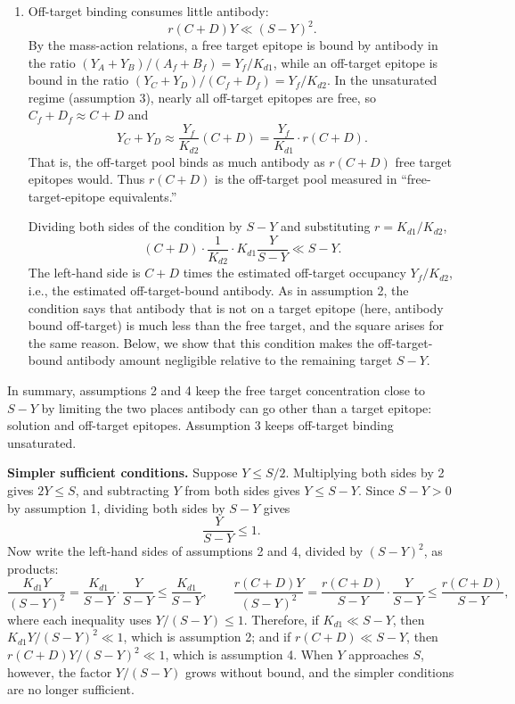\documentclass[11pt]{article}
\begin{document}
\begin{enumerate}
    The quantity $rY$ is not especially meaningful on its own; the
    rearrangement $Y\ll(S-Y)/r$ is more interpretable. Rearranging the
    mass-action relation, the target-bound antibody is
    $Y_A+Y_B=Y_f(A_f+B_f)/K_{d1}$. For $Y_f$ to reach $K_{d2}$ while about
    $S-Y$ target remains free, the target-bound antibody would have to be
    about $K_{d2}(S-Y)/K_{d1}=(S-Y)/r$. The condition says that the total
    antibody is far below this amount. Below, we show that this condition
    implies $Y_f\ll K_{d2}$.

    \item Off-target binding consumes little antibody:
    $$
    r(C+D)Y\ll(S-Y)^2.
    $$
    By the mass-action relations, a free target epitope is bound by
    antibody in the ratio $(Y_A+Y_B)/(A_f+B_f)=Y_f/K_{d1}$, while an
    off-target epitope is bound in the ratio
    $(Y_C+Y_D)/(C_f+D_f)=Y_f/K_{d2}$. In the unsaturated regime
    (assumption 3), nearly all off-target epitopes are free, so
    $C_f+D_f\approx C+D$ and
    $$
    Y_C+Y_D
    \approx\frac{Y_f}{K_{d2}}(C+D)
    =\frac{Y_f}{K_{d1}}\cdot r(C+D).
    $$
    That is, the off-target pool binds as much antibody as $r(C+D)$ free
    target epitopes would. Thus $r(C+D)$ is the off-target pool measured in
    ``free-target-epitope equivalents.''

    Dividing both sides of the condition by $S-Y$ and substituting
    $r=K_{d1}/K_{d2}$,
    $$
    (C+D)\cdot\frac{1}{K_{d2}}\cdot K_{d1}\frac{Y}{S-Y}\ll S-Y.
    $$
    The left-hand side is $C+D$ times the estimated off-target occupancy
    $Y_f/K_{d2}$, i.e., the estimated off-target-bound antibody. As in
    assumption 2, the condition says that antibody that is not on a target
    epitope (here, antibody bound off-target) is much less than the free
    target, and the square arises for the same reason. Below, we show that
    this condition makes the off-target-bound antibody amount negligible
    relative to the remaining target $S-Y$.
\end{enumerate}
In summary, assumptions 2 and 4 keep the free target concentration close
to $S-Y$ by limiting the two places antibody can go other than a target
epitope: solution and off-target epitopes. Assumption 3 keeps off-target
binding unsaturated.

\textbf{Simpler sufficient conditions.} Suppose $Y\le S/2$. Multiplying
both sides by 2 gives $2Y\le S$, and subtracting $Y$ from both sides gives
$Y\le S-Y$. Since $S-Y>0$ by assumption 1, dividing both sides by $S-Y$
gives
$$
\frac{Y}{S-Y}\le1.
$$
Now write the left-hand sides of assumptions 2 and 4, divided by
$(S-Y)^2$, as products:
$$
\frac{K_{d1}Y}{(S-Y)^2}
=\frac{K_{d1}}{S-Y}\cdot\frac{Y}{S-Y}
\le\frac{K_{d1}}{S-Y},
\qquad
\frac{r(C+D)Y}{(S-Y)^2}
=\frac{r(C+D)}{S-Y}\cdot\frac{Y}{S-Y}
\le\frac{r(C+D)}{S-Y},
$$
where each inequality uses $Y/(S-Y)\le1$. Therefore, if
$K_{d1}\ll S-Y$, then $K_{d1}Y/(S-Y)^2\ll1$, which is assumption 2; and
if $r(C+D)\ll S-Y$, then $r(C+D)Y/(S-Y)^2\ll1$, which is assumption 4.
When $Y$ approaches $S$, however, the factor $Y/(S-Y)$ grows without
bound, and the simpler conditions are no longer sufficient.
\end{document}
